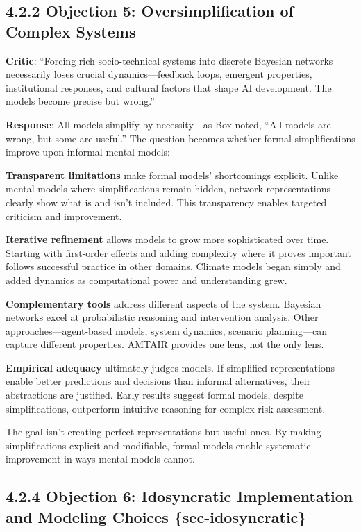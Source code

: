 \documentclass[
  11pt,
  letterpaper,
]{book}
\begin{document}
\subsection*{4.2.2 Objection 5: Oversimplification of Complex
Systems}\label{sec-oversimplification}

\textbf{Critic}: ``Forcing rich socio-technical systems into discrete
Bayesian networks necessarily loses crucial dynamics---feedback loops,
emergent properties, institutional responses, and cultural factors that
shape AI development. The models become precise but wrong.''

\textbf{Response}: All models simplify by necessity---as Box noted,
``All models are wrong, but some are useful.'' The question becomes
whether formal simplifications improve upon informal mental models:

\textbf{Transparent limitations} make formal models' shortcomings
explicit. Unlike mental models where simplifications remain hidden,
network representations clearly show what is and isn't included. This
transparency enables targeted criticism and improvement.

\textbf{Iterative refinement} allows models to grow more sophisticated
over time. Starting with first-order effects and adding complexity where
it proves important follows successful practice in other domains.
Climate models began simply and added dynamics as computational power
and understanding grew.

\textbf{Complementary tools} address different aspects of the system.
Bayesian networks excel at probabilistic reasoning and intervention
analysis. Other approaches---agent-based models, system dynamics,
scenario planning---can capture different properties. AMTAIR provides
one lens, not the only lens.

\textbf{Empirical adequacy} ultimately judges models. If simplified
representations enable better predictions and decisions than informal
alternatives, their abstractions are justified. Early results suggest
formal models, despite simplifications, outperform intuitive reasoning
for complex risk assessment.

The goal isn't creating perfect representations but useful ones. By
making simplifications explicit and modifiable, formal models enable
systematic improvement in ways mental models cannot.

\textcite{box1976}

\subsection*{4.2.4 Objection 6: Idosyncratic Implementation and Modeling
Choices
\{sec-idosyncratic\}}\label{objection-6-idosyncratic-implementation-and-modeling-choices-sec-idosyncratic}
\end{document}
